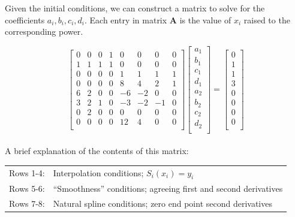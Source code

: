 \documentclass[11pt]{article}
\begin{document}
\begin{enumerate}
\begin{enumerate}[(a)]
				Given the initial conditions, we can construct a matrix to solve for the coefficients $a_i, b_i, c_i, d_i$.
				Each entry in matrix $\mathbf{A}$ is the value of $x_i$ raised to the corresponding power.

				\[
					\begin{bmatrix}
						0 & 0 & 0 & 1 & 0 & 0 & 0 & 0\\
						1 & 1 & 1 & 1 & 0 & 0 & 0 & 0\\
						0 & 0 & 0 & 0 & 1 & 1 & 1 & 1\\
						0 & 0 & 0 & 0 & 8 & 4 & 2 & 1\\
						6 & 2 & 0 & 0 &-6 &-2 & 0 & 0\\
						3 & 2 & 1 & 0 &-3 &-2 &-1 & 0\\
						0 & 2 & 0 & 0 & 0 & 0 & 0 & 0\\
						0 & 0 & 0 & 0 &12 & 4 & 0 & 0\\
					\end{bmatrix}
					\begin{bmatrix}
						a_1 \\
						b_1 \\
						c_1 \\
						d_1 \\
						a_2 \\
						b_2 \\
						c_2 \\
						d_2 \\
					\end{bmatrix}
					=
					\begin{bmatrix}
						0 \\
						1 \\
						1 \\
						3 \\
						0 \\
						0 \\
						0 \\
						0 \\
					\end{bmatrix}
				\] \\

				A brief explanation of the contents of this matrix:

				\begin{tabular}{cl}
					Rows 1-4: & Interpolation conditions; $S_i(x_i) = y_i$ \\
					Rows 5-6: & ``Smoothness'' conditions; agreeing first and second derivatives \\
					Rows 7-8: & Natural spline conditions; zero end point second derivatives \\
				\end{tabular} \


\end{enumerate}
\end{enumerate}
\end{document}
